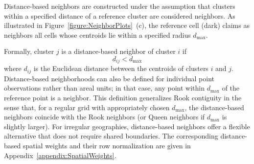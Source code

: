 \documentclass{article}[11pt]
\begin{document}
Distance-based neighbors\cite{fotheringham_sage_2009} are constructed under the assumption that clusters within a specified distance of a reference cluster are considered neighbors. As illustrated in Figure~\ref{figure:NeighborPlots}~(c), the reference cell (dark) claims as neighbors all cells whose centroids lie within a specified radius $d_{\max}$.

Formally, cluster $j$ is a distance-based neighbor of cluster $i$ if
\begin{equation}
    d_{ij} < d_{\max}
\end{equation}
where $d_{ij}$ is the Euclidean distance between the centroids of clusters $i$ and $j$. Distance-based neighborhoods can also be defined for individual point observations rather than areal units; in that case, any point within $d_{\max}$ of the reference point is a neighbor. This definition generalizes Rook contiguity in the sense that, for a regular grid with appropriately chosen $d_{\max}$, the distance-based neighbors coincide with the Rook neighbors (or Queen neighbors if $d_{\max}$ is slightly larger). For irregular geographies, distance-based neighbors offer a flexible alternative that does not require shared boundaries. The corresponding distance-based spatial weights and their row normalization are given in Appendix~\ref{appendix:SpatialWeights}.
\end{document}
